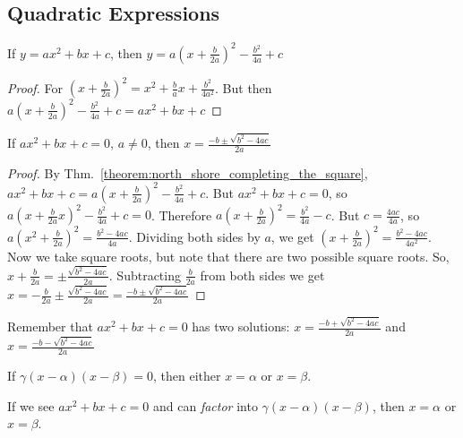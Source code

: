 \documentclass[crop=false,class=article,oneside]{standalone}
\begin{document}
    \subsection{Quadratic Expressions}
        \begin{theorem}
        \label{theorem:north_shore_completing_the_square}
        If $y=ax^{2}+bx+c$, then $y=a(x+\frac{b}{2a})^{2}-\frac{b^2}{4a}+c$
        \end{theorem}
        \begin{proof}
        For $(x+\frac{b}{2a})^{2}=x^{2}+\frac{b}{a}x+\frac{b^{2}}{4a^{2}}$. But then $a(x+\frac{b}{2a})^{2}-\frac{b^{2}}{4a}+c=ax^{2}+bx+c$
        \end{proof}
        \begin{theorem}
        \label{theorem:north_shore_quadratic_formula_theorem}
        If $ax^{2}+bx+c=0$, $a\ne 0$, then $x=\frac{-b\pm\sqrt{b^{2}-4ac}}{2a}$
        \end{theorem}
        \begin{proof}
        By Thm.~\ref{theorem:north_shore_completing_the_square}, $ax^{2}+bx+c=a(x+\frac{b}{2a})^{2}-\frac{b^{2}}{4a}+c$. But $ax^{2}+bx+c=0$, so $a(x+\frac{b}{2a}x)^{2}-\frac{b^{2}}{4a}+c=0$. Therefore $a(x+\frac{b}{2a})^{2}=\frac{b^2}{4a}-c$. But $c=\frac{4ac}{4a}$, so $a(x^2+\frac{b}{2a})^{2}=\frac{b^{2}-4ac}{4a}$. Dividing both sides by $a$, we get $(x+\frac{b}{2a})^{2}=\frac{b^{2}-4ac}{4a^{2}}$. Now we take square roots, but note that there are two possible square roots. So, $x+\frac{b}{2a}=\pm\frac{\sqrt{b^{2}-4ac}}{2a}$. Subtracting $\frac{b}{2a}$ from both sides we get $x=-\frac{b}{2a}\pm\frac{\sqrt{b^{2}-4ac}}{2a}=\frac{-b\pm\sqrt{b^{2}-4ac}}{2a}$
        \end{proof}
        \begin{remark}
        Remember that $ax^{2}+bx+c=0$ has two solutions: $x=\frac{-b+\sqrt{b^{2}-4ac}}{2a}$ and $x=\frac{-b-\sqrt{b^{2}-4ac}}{2a}$
        \end{remark}
        \begin{theorem}
        \label{theorem:north_shore_zeros_of_a_factored_polynomial}
        If $\gamma(x-\alpha)(x-\beta)=0$, then either $x=\alpha$ or $x=\beta$.
        \end{theorem}
        \begin{remark}
        If we see $ax^{2}+bx+c=0$ and can \textit{factor} into $\gamma(x-\alpha)(x-\beta)$, then $x=\alpha$ or $x=\beta$.
        \end{remark}
\end{document}
